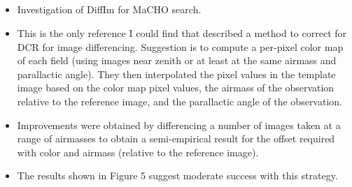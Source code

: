 \documentclass[]{article}
\begin{document}
\subsection{\cite{AlcockDiffIm1999}}
\begin{itemize}
\item Investigation of DiffIm for MaCHO search.
\item This is the only reference I could find that described a method
  to correct for DCR for image differencing. Suggestion is to compute a
  per-pixel color map of each field (using images near zenith or at
  least at the same airmass and parallactic angle). They then
  interpolated the pixel values in the template image based on the
  color map pixel values, the airmass of the observation relative to
  the reference image, and the parallactic angle of the observation.
\item Improvements were obtained by differencing a number of images
  taken at a range of airmasses to obtain a semi-empirical result for
  the offset required with color and airmass (relative to the
  reference image).
\item The results shown in Figure 5 suggest moderate success with this
  strategy.
\end{itemize}
\end{document}
